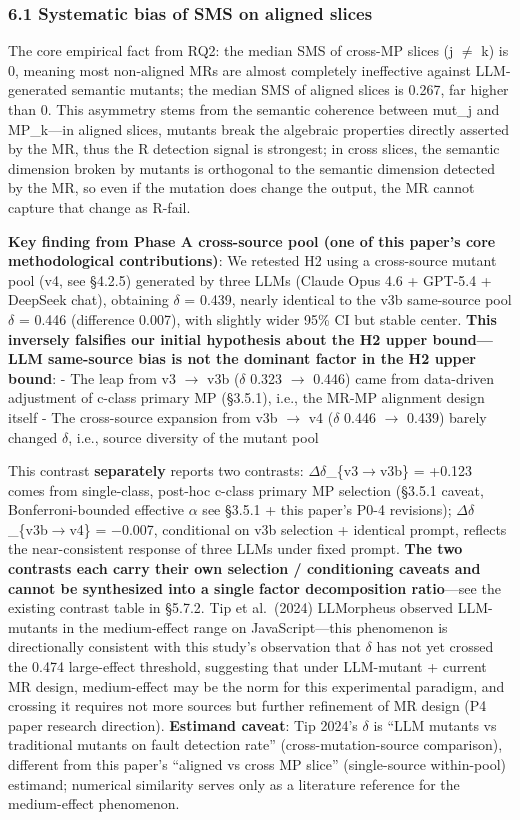 \documentclass[review,12pt,authoryear]{elsarticle}
\begin{document}
\subsubsection{6.1 Systematic bias of SMS on aligned
slices}\label{systematic-bias-of-sms-on-aligned-slices}

The core empirical fact from RQ2: the median SMS of cross-MP slices (j $\neq$
k) is 0, meaning most non-aligned MRs are almost completely ineffective
against LLM-generated semantic mutants; the median SMS of aligned slices
is 0.267, far higher than 0. This asymmetry stems from the semantic
coherence between mut\_j and MP\_k---in aligned slices, mutants break
the algebraic properties directly asserted by the MR, thus the R
detection signal is strongest; in cross slices, the semantic dimension
broken by mutants is orthogonal to the semantic dimension detected by
the MR, so even if the mutation does change the output, the MR cannot
capture that change as R-fail.

\textbf{Key finding from Phase A cross-source pool (one of this paper's
core methodological contributions)}: We retested H2 using a cross-source
mutant pool (v4, see §4.2.5) generated by three LLMs (Claude Opus 4.6 +
GPT-5.4 + DeepSeek chat), obtaining $\delta$ = 0.439, nearly identical to the
v3b same-source pool $\delta$ = 0.446 (difference 0.007), with slightly wider
95\% CI but stable center. \textbf{This inversely falsifies our initial
hypothesis about the H2 upper bound---LLM same-source bias is not the
dominant factor in the H2 upper bound}: - The leap from v3 $\to$ v3b ($\delta$
0.323 $\to$ 0.446) came from data-driven adjustment of c-class primary MP
(§3.5.1), i.e., the MR-MP alignment design itself - The cross-source
expansion from v3b $\to$ v4 ($\delta$ 0.446 $\to$ 0.439) barely changed $\delta$, i.e., source
diversity of the mutant pool

This contrast \textbf{separately} reports two contrasts: $\Delta$$\delta$\_\{v3$\to$v3b\}
= +0.123 comes from single-class, post-hoc c-class primary MP selection
(§3.5.1 caveat, Bonferroni-bounded effective $\alpha$ see §3.5.1 + this paper's
P0-4 revisions); $\Delta$$\delta$\_\{v3b$\to$v4\} = −0.007, conditional on v3b selection +
identical prompt, reflects the near-consistent response of three LLMs
under fixed prompt. \textbf{The two contrasts each carry their own
selection / conditioning caveats and cannot be synthesized into a single
factor decomposition ratio}---see the existing contrast table in §5.7.2.
Tip et al.~(2024) LLMorpheus observed LLM-mutants in the medium-effect
range on JavaScript---this phenomenon is directionally consistent with
this study's observation that $\delta$ has not yet crossed the 0.474
large-effect threshold, suggesting that under LLM-mutant + current MR
design, medium-effect may be the norm for this experimental paradigm,
and crossing it requires not more sources but further refinement of MR
design (P4 paper research direction). \textbf{Estimand caveat}: Tip
2024's $\delta$ is ``LLM mutants vs traditional mutants on fault detection
rate'' (cross-mutation-source comparison), different from this paper's
``aligned vs cross MP slice'' (single-source within-pool) estimand;
numerical similarity serves only as a literature reference for the
medium-effect phenomenon.
\end{document}

